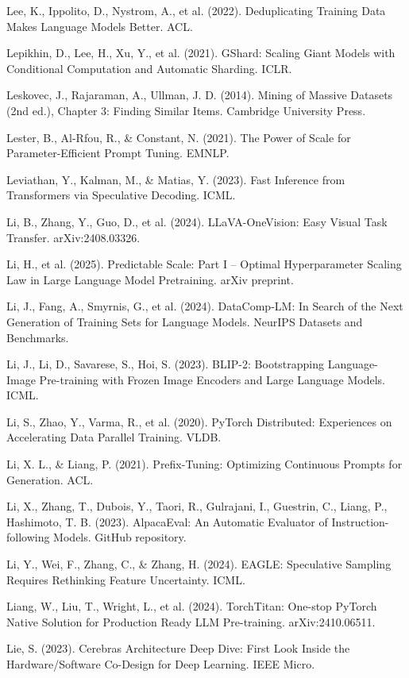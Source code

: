 {\begin{enumerate}[leftmargin=*,itemsep=1pt,label={[\arabic*]}]
\item Lee, K., Ippolito, D., Nystrom, A., et al. (2022). Deduplicating Training Data Makes Language Models Better. ACL.
\item Lepikhin, D., Lee, H., Xu, Y., et al. (2021). GShard: Scaling Giant Models with Conditional Computation and Automatic Sharding. ICLR.
\item Leskovec, J., Rajaraman, A., Ullman, J. D. (2014). Mining of Massive Datasets (2nd ed.), Chapter 3: Finding Similar Items. Cambridge University Press.
\item Lester, B., Al-Rfou, R., \& Constant, N. (2021). The Power of Scale for Parameter-Efficient Prompt Tuning. EMNLP.
\item Leviathan, Y., Kalman, M., \& Matias, Y. (2023). Fast Inference from Transformers via Speculative Decoding. ICML.
\item Li, B., Zhang, Y., Guo, D., et al. (2024). LLaVA-OneVision: Easy Visual Task Transfer. arXiv:2408.03326.
\item Li, H., et al. (2025). Predictable Scale: Part I -- Optimal Hyperparameter Scaling Law in Large Language Model Pretraining. arXiv preprint.
\item Li, J., Fang, A., Smyrnis, G., et al. (2024). DataComp-LM: In Search of the Next Generation of Training Sets for Language Models. NeurIPS Datasets and Benchmarks.
\item Li, J., Li, D., Savarese, S., Hoi, S. (2023). BLIP-2: Bootstrapping Language-Image Pre-training with Frozen Image Encoders and Large Language Models. ICML.
\item Li, S., Zhao, Y., Varma, R., et al. (2020). PyTorch Distributed: Experiences on Accelerating Data Parallel Training. VLDB.
\item Li, X. L., \& Liang, P. (2021). Prefix-Tuning: Optimizing Continuous Prompts for Generation. ACL.
\item Li, X., Zhang, T., Dubois, Y., Taori, R., Gulrajani, I., Guestrin, C., Liang, P., Hashimoto, T. B. (2023). AlpacaEval: An Automatic Evaluator of Instruction-following Models. GitHub repository.
\item Li, Y., Wei, F., Zhang, C., \& Zhang, H. (2024). EAGLE: Speculative Sampling Requires Rethinking Feature Uncertainty. ICML.
\item Liang, W., Liu, T., Wright, L., et al. (2024). TorchTitan: One-stop PyTorch Native Solution for Production Ready LLM Pre-training. arXiv:2410.06511.
\item Lie, S. (2023). Cerebras Architecture Deep Dive: First Look Inside the Hardware/Software Co-Design for Deep Learning. IEEE Micro.

\end{enumerate}}
